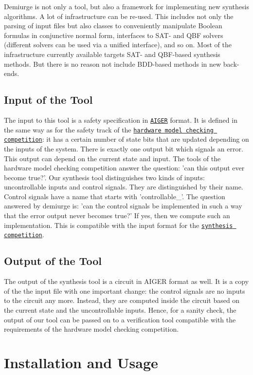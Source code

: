 Demiurge is not only a tool, but also a framework for implementing new synthesis algorithms. A lot of infrastructure can be re-\/used. This includes not only the parsing of input files but also classes to conveniently manipulate Boolean formulas in conjunctive normal form, interfaces to S\-A\-T-\/ and Q\-B\-F solvers (different solvers can be used via a unified interface), and so on. Most of the infrastructure currently available targets S\-A\-T-\/ and Q\-B\-F-\/based synthesis methods. But there is no reason not include B\-D\-D-\/based methods in new back-\/ends.\hypertarget{index_input_sec}{}\subsection{Input of the Tool}\label{index_input_sec}
The input to this tool is a safety specification in \href{http://fmv.jku.at/aiger/}{\tt A\-I\-G\-E\-R} format. It is defined in the same way as for the safety track of the \href{http://fmv.jku.at/hwmcc13/}{\tt hardware model checking competition}\-: it has a certain number of state bits that are updated depending on the inputs of the system. There is exactly one output bit which signals an error. This output can depend on the current state and input. The tools of the hardware model checking competition answer the question\-: 'can this output ever become true?'. Our synthesis tool distinguishes two kinds of inputs\-: uncontrollable inputs and control signals. They are distinguished by their name. Control signals have a name that starts with 'controllable\-\_\-'. The question answered by demiurge is\-: 'can the control signals be implemented in such a way that the error output never becomes true?' If yes, then we compute such an implementation. This is compatible with the input format for the \href{http://www.syntcomp.org/}{\tt synthesis competition}.\hypertarget{index_output_sec}{}\subsection{Output of the Tool}\label{index_output_sec}
The output of the synthesis tool is a circuit in A\-I\-G\-E\-R format as well. It is a copy of the the input file with one important change\-: the control signals are no inputs to the circuit any more. Instead, they are computed inside the circuit based on the current state and the uncontrollable inputs. Hence, for a sanity check, the output of our tool can be passed on to a verification tool compatible with the requirements of the hardware model checking competition.\hypertarget{index_install_sec}{}\section{Installation and Usage}\label{index_install_sec}
